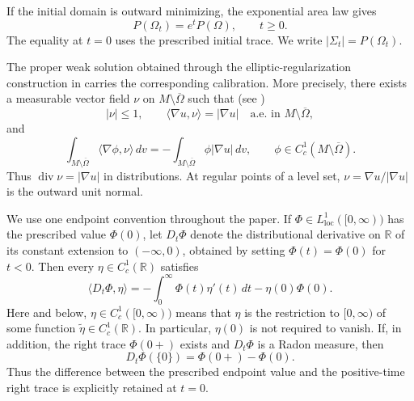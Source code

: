 \documentclass[11pt,reqno]{amsart}
\numberwithin{equation}{section}
\theoremstyle{definition}
\newcommand{\diver}{\operatorname{div}}
\begin{document}
If the initial domain is outward minimizing, the exponential area law \cite[Lemma~1.6]{HI2001} gives
\begin{equation}\label{eq:area-growth}
    P(\Omega_t)=e^tP(\Omega),
    \qquad t\geq0.
\end{equation}
The equality at $t=0$ uses the prescribed initial trace.  We write $|\Sigma_t|=P(\Omega_t)$.

The proper weak solution obtained through the elliptic-regularization construction in \cite[Theorem 3.1]{HI2001} carries the corresponding calibration. More precisely, there exists a measurable vector field $\nu$ on $M\setminus\overline\Omega$ such that (see \cite[(3.15)]{HI2001})
\begin{equation}\label{eq:calibration}
    |\nu|\leq1,
    \qquad
    \langle\nabla u,\nu\rangle=|\nabla u|
    \quad\text{a.e. in }M\setminus\overline\Omega,
\end{equation}
and
\begin{equation}\label{eq:calibration-div}
    \int_{M\setminus\overline\Omega}\langle\nabla\phi,\nu\rangle\,dv
    =-\int_{M\setminus\overline\Omega}\phi|\nabla u|\,dv,
    \qquad
    \phi\in C_c^1(M\setminus\overline\Omega).
\end{equation}
Thus $\diver\nu=|\nabla u|$ in distributions.  At regular points of a level set, $\nu=\nabla u/|\nabla u|$ is the outward unit normal.

We use one endpoint convention throughout the paper.  If $\Phi\in L^1_{\mathrm{loc}}([0,\infty))$ has the prescribed value $\Phi(0)$, let $D_t\Phi$ denote the distributional derivative on $\mathbb R$ of its constant extension to $(-\infty,0)$, obtained by setting $\Phi(t)=\Phi(0)$ for $t<0$.  Then every $\eta\in C_c^1(\mathbb R)$ satisfies
\begin{equation}\label{eq:endpoint-derivative-convention}
    \langle D_t\Phi,\eta\rangle
    =-\int_0^\infty\Phi(t)\eta'(t)\,dt-\eta(0)\Phi(0).
\end{equation}
Here and below, $\eta\in C_c^1([0,\infty))$ means that $\eta$ is the restriction to $[0,\infty)$ of some function $\widetilde{\eta}\in C_c^1(\mathbb R)$. In particular, $\eta(0)$ is not required to vanish. If, in addition, the right trace $\Phi(0+)$ exists and $D_t\Phi$ is a Radon measure, then
\begin{equation*}
    D_t\Phi(\{0\})=\Phi(0+)-\Phi(0).
\end{equation*}
Thus the difference between the prescribed endpoint value and the positive-time right trace is explicitly retained at $t=0$.
\end{document}
